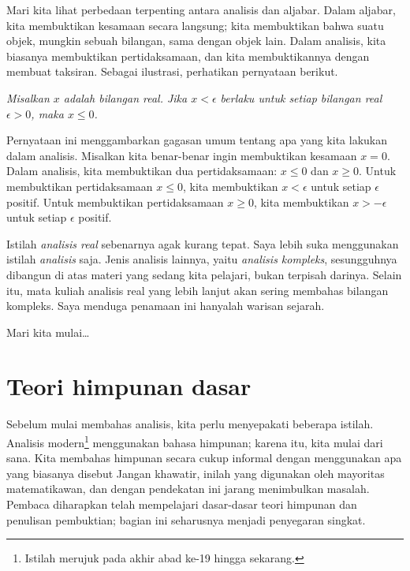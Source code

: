 \medskip

Mari kita lihat perbedaan terpenting antara analisis dan aljabar. Dalam
aljabar, kita membuktikan kesamaan secara langsung; kita membuktikan bahwa suatu
objek, mungkin sebuah bilangan, sama dengan objek lain. Dalam analisis, kita
biasanya membuktikan pertidaksamaan, dan kita membuktikannya dengan membuat
taksiran. Sebagai ilustrasi, perhatikan pernyataan berikut.

\medskip

\emph{Misalkan $x$ adalah bilangan real. Jika $x < \epsilon$ berlaku untuk
setiap bilangan real $\epsilon > 0$, maka $x \leq 0$.}

\medskip

Pernyataan ini menggambarkan gagasan umum tentang apa yang kita lakukan dalam
analisis. Misalkan kita benar-benar ingin membuktikan kesamaan $x = 0$. Dalam
analisis, kita membuktikan dua pertidaksamaan: $x \leq 0$ dan $x \geq 0$.
Untuk membuktikan pertidaksamaan $x \leq 0$, kita membuktikan
$x < \epsilon$ untuk setiap $\epsilon$ positif. Untuk membuktikan
pertidaksamaan $x \geq 0$, kita membuktikan $x > -\epsilon$ untuk setiap
$\epsilon$ positif.

\medskip

Istilah \emph{analisis real} sebenarnya agak kurang tepat. Saya lebih suka
menggunakan istilah \emph{analisis} saja. Jenis analisis lainnya, yaitu
\emph{analisis kompleks}, sesungguhnya dibangun di atas materi yang sedang kita
pelajari, bukan terpisah darinya. Selain itu, mata kuliah analisis real yang
lebih lanjut akan sering membahas bilangan kompleks. Saya menduga penamaan ini
hanyalah warisan sejarah.

\medskip

Mari kita mulai\ldots



\sectionnewpage
\section{Teori himpunan dasar} \label{sec:basicset}



Sebelum mulai membahas analisis, kita perlu menyepakati beberapa istilah.
Analisis modern\footnote{Istilah  merujuk pada akhir abad ke-19
hingga sekarang.}
menggunakan bahasa himpunan; karena itu, kita mulai dari sana.
Kita membahas himpunan secara cukup informal dengan menggunakan apa yang
biasanya disebut   Jangan khawatir,
inilah yang digunakan oleh mayoritas matematikawan, dan dengan pendekatan ini
jarang menimbulkan masalah.
Pembaca diharapkan telah mempelajari dasar-dasar teori himpunan dan penulisan
pembuktian; bagian ini seharusnya menjadi penyegaran singkat.

